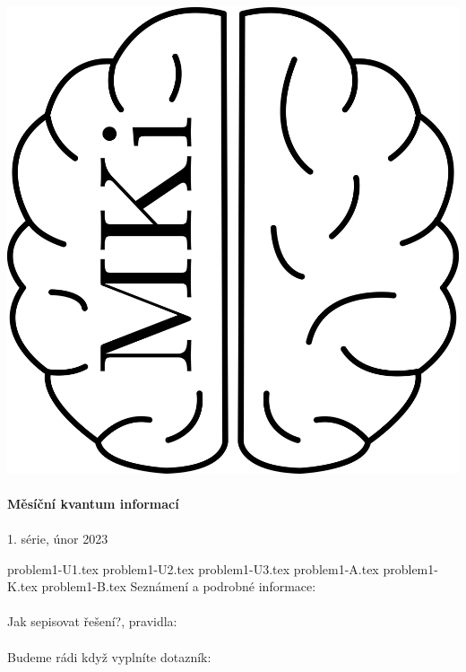 \documentclass[12pt]{article}
\begin{document}
\thispagestyle{firststyle}
\vspace*{\fill}
\begin{center}
\includegraphics[scale=1]{../../../../propagace/logo/mkilogo.png}\\
\quad\\
\textbf{\Huge{Měsíční kvantum informací}}\\
\quad\\
\LARGE{1. série, únor 2023}
\end{center}
\vspace*{\fill}

\newpage
{problem1-U1.tex}
\newpage
{problem1-U2.tex}
{problem1-U3.tex}
{problem1-A.tex}
{problem1-K.tex}
{problem1-B.tex}
\newpage
Seznámení a podrobné informace:\\
\\

Jak sepisovat řešení?, pravidla:\\
\\

Budeme rádi když vyplníte dotazník:\\
\\
\vspace*{\fill}
\end{document}
